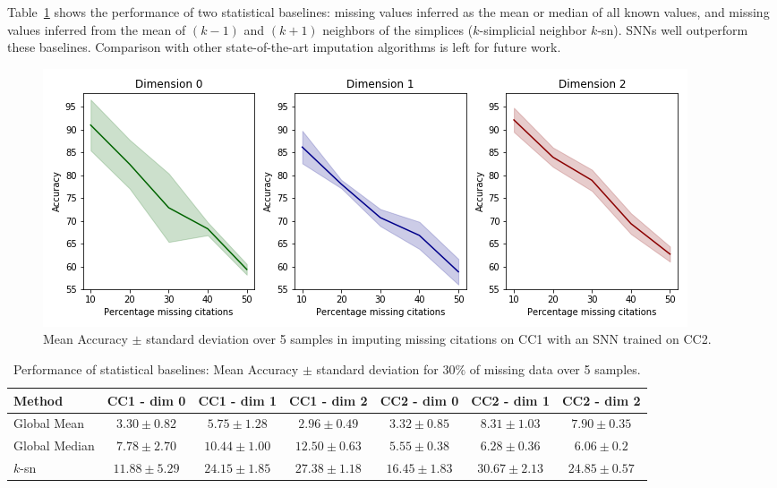 Table~\ref{table:comparison-SNN} shows the performance of two statistical baselines: missing values inferred as the mean or median of all known values, and missing values inferred from the mean of $(k-1)$ and $(k+1)$ neighbors of the simplices ($k$-simplicial neighbor $k$-sn). SNNs well outperform these baselines.
Comparison with other state-of-the-art imputation algorithms is left for future work.

\begin{figure}[htbp]
  \centering
\includegraphics[scale=0.35]{./figures/accuracy_network1_pretrained.png}
  \caption{Mean Accuracy $\pm$ standard deviation over 5 samples in imputing missing citations on CC1 with an SNN trained on CC2.} \label{fig:transfer-learning}
\end{figure}

\begin{table}[htbp]
  \centering
  \scriptsize{
  \begin{tabular}{lcccccc}
    \toprule
    Method   & CC1 - dim 0   & CC1 - dim 1   & CC1 - dim 2   & CC2 - dim 0  & CC2 - dim 1  & CC2 - dim 2 \\
    \midrule
   Global Mean & $3.30 \pm 0.82$ & $5.75\pm 1.28$  &$ 2.96\pm 0.49$  & $3.32 \pm 0.85$ & $8.31 \pm 1.03$  & $7.90\pm 0.35$\\
    Global Median & $7.78 \pm 2.70$   & $10.44 \pm 1.00$ &$ 12.50 \pm 0.63 $ & $5.55 \pm 0.38 $&$ 6.28\pm 0.36  $&$ 6.06\pm 0.2$\\
    $k$-sn & $11.88\pm 5.29 $& $24.15 \pm 1.85$ & $27.38 \pm 1.18  $& $16.45 \pm 1.83 $&$ 30.67\pm 2.13$   &$ 24.85 \pm 0.57 $\\
    \bottomrule
  \end{tabular}}
   \vspace{2pt}
  \caption{%
      Performance of statistical baselines: Mean Accuracy $\pm$ standard deviation for $30\%$ of missing data over 5 samples.
  }\label{table:comparison-SNN}
\end{table}%